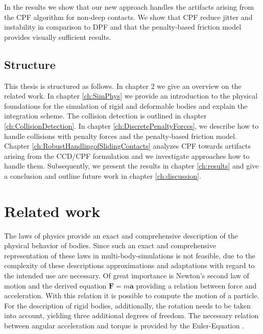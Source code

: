 In the results we show that our new approach handles the artifacts arising from the CPF algorithm for non-deep contacts. We show that CPF reduce jitter and instability in comparison to DPF and that the penalty-based friction model provides visually sufficient results.

\section{Structure}
This thesis is structured as follows. In chapter 2 we give an overview on the related work.
In chapter \ref{ch:SimPhys} we provide an introduction to the physical foundations for the simulation of rigid and deformable bodies and explain the integration scheme.
The collision detection is outlined in chapter \ref{ch:CollisionDetection}. In chapter \ref{ch:DiscretePenaltyForces}, we describe how to handle collisions with penalty forces and the penalty-based friction model. Chapter \ref{ch:RobustHandlingofSlidingContacts} analyzes CPF towards artifacts arising from the CCD/CPF formulation and we investigate approaches how to handle them.
Subsequently, we present the results in chapter \ref{ch:results} and give a conclusion and outline future work in chapter \ref{ch:discussion}.

\chapter{Related work}


The laws of physics provide an exact and comprehensive description of the physical behavior of bodies. Since such an exact and comprehensive representation of these laws in multi-body-simulations is not feasible, due to the complexity of these descriptions approximations and adaptations with regard to the intended use are necessary.
 Of great importance is Newton's second law of motion and the derived equation $ \mathbf F=m \mathbf a$ providing a relation between force and acceleration.
With this relation it is possible to compute the motion of a particle.
For the description of rigid bodies, additionally, the rotation needs to be taken into account, yielding three additional degrees of freedom. The necessary relation between angular acceleration and torque is provided by the Euler-Equation \cite{BENDER2007}.

